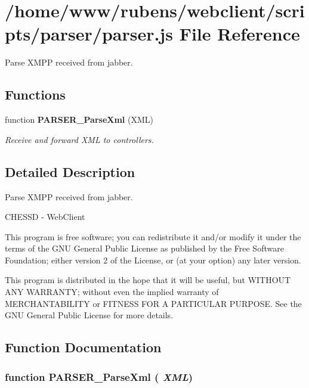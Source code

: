 \section{/home/www/rubens/webclient/scripts/parser/parser.js File Reference}
\label{parser_8js}
Parse XMPP received from jabber. 

\subsection*{Functions}
\begin{CompactItemize}
\item 
function {\bf PARSER\_\-ParseXml} (XML)
\begin{CompactList}\small\item\em Receive and forward XML to controllers. \item\end{CompactList}\end{CompactItemize}


\subsection{Detailed Description}
Parse XMPP received from jabber. 

CHESSD - WebClient

This program is free software; you can redistribute it and/or modify it under the terms of the GNU General Public License as published by the Free Software Foundation; either version 2 of the License, or (at your option) any later version.

This program is distributed in the hope that it will be useful, but WITHOUT ANY WARRANTY; without even the implied warranty of MERCHANTABILITY or FITNESS FOR A PARTICULAR PURPOSE. See the GNU General Public License for more details. 

\subsection{Function Documentation}
\subsubsection[PARSER\_\-ParseXml]{\setlength{\rightskip}{0pt plus 5cm}function PARSER\_\-ParseXml ( {\em XML})}\label{parser_8js_c7931012d8fb83037a53d1c1b50d541e}



